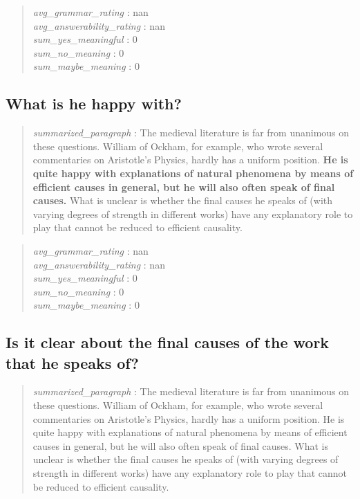 \begin{quote}
\emph{avg\_grammar\_rating} : nan\\
\emph{avg\_answerability\_rating} : nan\\
\emph{sum\_yes\_meaningful} : 0\\
\emph{sum\_no\_meaning} : 0\\
\emph{sum\_maybe\_meaning} : 0
\end{quote}

\hypertarget{what-is-he-happy-with}{%
\subsection{What is he happy with?}\label{what-is-he-happy-with}}

\begin{quote}
\emph{summarized\_paragraph} : The medieval literature is far from
unanimous on these questions. William of Ockham, for example, who wrote
several commentaries on Aristotle's Physics, hardly has a uniform
position. \textbf{He is quite happy with explanations of natural
phenomena by means of efficient causes in general, but he will also
often speak of final causes.} What is unclear is whether the final
causes he speaks of (with varying degrees of strength in different
works) have any explanatory role to play that cannot be reduced to
efficient causality.
\end{quote}

\begin{quote}
\emph{avg\_grammar\_rating} : nan\\
\emph{avg\_answerability\_rating} : nan\\
\emph{sum\_yes\_meaningful} : 0\\
\emph{sum\_no\_meaning} : 0\\
\emph{sum\_maybe\_meaning} : 0
\end{quote}

\hypertarget{is-it-clear-about-the-final-causes-of-the-work-that-he-speaks-of}{%
\subsection{Is it clear about the final causes of the work that he
speaks
of?}\label{is-it-clear-about-the-final-causes-of-the-work-that-he-speaks-of}}

\begin{quote}
\emph{summarized\_paragraph} : The medieval literature is far from
unanimous on these questions. William of Ockham, for example, who wrote
several commentaries on Aristotle's Physics, hardly has a uniform
position. He is quite happy with explanations of natural phenomena by
means of efficient causes in general, but he will also often speak of
final causes. What is unclear is whether the final causes he speaks of
(with varying degrees of strength in different works) have any
explanatory role to play that cannot be reduced to efficient causality.
\end{quote}

